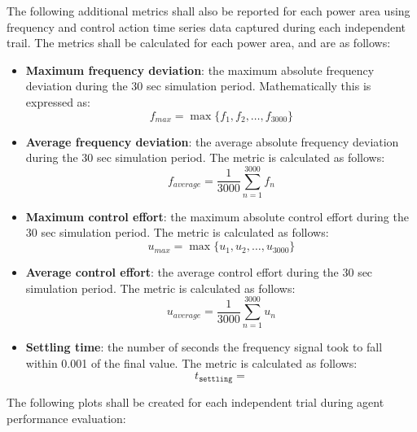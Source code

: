 The following additional metrics shall also be reported for each power area using frequency and control action time series data captured during each independent trail. The metrics shall be calculated for each power area, and are as follows:
\begin{itemize}
	\item \textbf{Maximum frequency deviation}: the maximum absolute frequency deviation during the 30 sec simulation period. Mathematically this is expressed as:\\
		\begin{equation}
			f_{max} = \max \big\{ f_1, f_2, \dotsc, f_{3000} \big\}
		\end{equation}
	
	\item \textbf{Average frequency deviation}: the average absolute frequency deviation during the 30 sec simulation period. The metric is calculated as follows:\\
		\begin{equation}
			f_{average} = \frac{1}{3000}\sum_{n=1}^{3000} f_n
		\end{equation}
		
	\item \textbf{Maximum control effort}: the maximum absolute control effort during the 30 sec simulation period. The metric is calculated as follows:\\
		\begin{equation}
			u_{max} = \max \big\{ u_1, u_2, \dotsc, u_{3000} \big\}
		\end{equation}
		
	\item \textbf{Average control effort}: the average control effort during the 30 sec simulation period. The metric is calculated as follows:\\
		\begin{equation}
			u_{average} = \frac{1}{3000}\sum_{n=1}^{3000} u_n
		\end{equation}
		
	\item \textbf{Settling time}: the number of seconds the frequency signal took to fall within 0.001 of the final value. The metric is calculated as follows:\\
		\begin{equation}
			t_{\texttt{settling}} = 
		\end{equation}
\end{itemize}

The following plots shall be created for each independent trial during agent performance evaluation:

